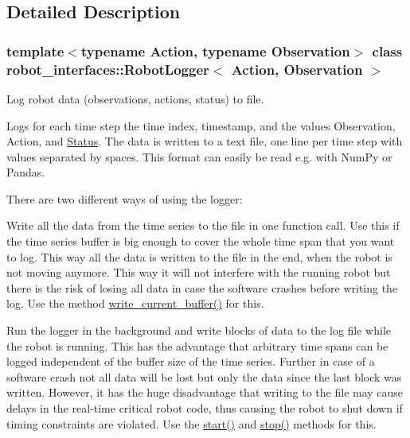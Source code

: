 \subsection{Detailed Description}
\subsubsection*{template$<$typename Action, typename Observation$>$\newline
class robot\+\_\+interfaces\+::\+Robot\+Logger$<$ Action, Observation $>$}

Log robot data (observations, actions, status) to file. 

Logs for each time step the time index, timestamp, and the values Observation, Action, and \hyperlink{structrobot__interfaces_1_1Status}{Status}. The data is written to a text file, one line per time step with values separated by spaces. This format can easily be read e.\+g. with Num\+Py or Pandas.

There are two different ways of using the logger\+:


\begin{DoxyEnumerate}
\item Write all the data from the time series to the file in one function call. Use this if the time series buffer is big enough to cover the whole time span that you want to log. This way all the data is written to the file in the end, when the robot is not moving anymore. This way it will not interfere with the running robot but there is the risk of losing all data in case the software crashes before writing the log. Use the method {\ttfamily \hyperlink{classrobot__interfaces_1_1RobotLogger_ada7467fbac96a67ab798c4e6ef56c9b1}{write\+\_\+current\+\_\+buffer()}} for this.
\item Run the logger in the background and write blocks of data to the log file while the robot is running. This has the advantage that arbitrary time spans can be logged independent of the buffer size of the time series. Further in case of a software crash not all data will be lost but only the data since the last block was written. However, it has the huge disadvantage that writing to the file may cause delays in the real-\/time critical robot code, thus causing the robot to shut down if timing constraints are violated. Use the {\ttfamily \hyperlink{classrobot__interfaces_1_1RobotLogger_a7a1b50c75aab3255ac7e6d412de833d1}{start()}} and {\ttfamily \hyperlink{classrobot__interfaces_1_1RobotLogger_a55ec7dcacd849adee53fa49a2a0c8234}{stop()}} methods for this.
\end{DoxyEnumerate}


